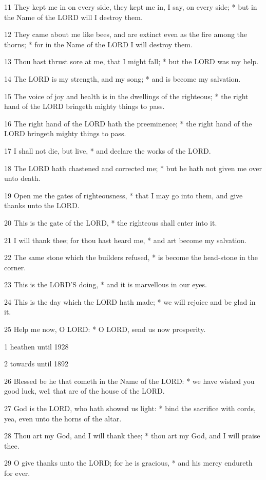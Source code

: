 11 They kept me in on every side, they kept me in,
I say, on every side; * but in the Name of the LORD will I destroy them.

12 They came about me like bees, and are extinct even
as the fire among the thorns; * for in the Name of the LORD I will destroy
them.

13 Thou hast thrust sore at me, that I might fall;
* but the LORD was my help.

14 The LORD is my strength, and my song; * and is become
my salvation.

15 The voice of joy and health is in the dwellings
of the righteous; * the right hand of the LORD bringeth mighty things
to pass.

16 The right hand of the LORD hath the preeminence;
* the right hand of the LORD bringeth mighty things to pass.

17 I shall not die, but live, * and declare the works
of the LORD.

18 The LORD hath chastened and corrected me; * but
he hath not given me over unto death.

19 Open me the gates of righteousness, * that I may
go into them, and give thanks unto the LORD.

20 This is the gate of the LORD, * the righteous shall
enter into it.

21 I will thank thee; for thou hast heard me, * and
art become my salvation.

22 The same stone which the builders refused, * is
become the head-stone in the corner.

23 This is the LORD’S doing, * and it is marvellous
in our eyes.

24 This is the day which the LORD hath made; * we will
rejoice and be glad in it.

25 Help me now, O LORD: * O LORD, send us now prosperity.

1 heathen until
1928

2 towards
until
1892

26 Blessed be he that cometh in the Name of the LORD: * we have wished
you good luck, we1 that are of the house of the LORD.

27 God is the LORD, who hath showed us light: * bind
the sacrifice with cords, yea, even unto the horns of the altar.

28 Thou art my God, and I will thank thee; * thou art
my God, and I will praise thee.

29 O give thanks unto the LORD; for he is gracious,
* and his mercy endureth for ever. 

